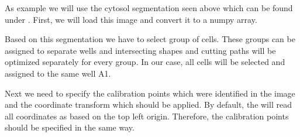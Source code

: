\documentclass[a4paper,10pt,english,openany,oneside]{sphinxmanual}
\begin{document}
\sphinxAtStartPar
As example we will use the cytosol segmentation seen above which can be found under . First, we will load this image and convert it to a numpy array.

\begin{sphinxVerbatim}[commandchars=\\\{\}]
   
   

  
  
\end{sphinxVerbatim}

\sphinxAtStartPar
Based on this segmentation we have to select group of cells. These groups can be assigned to separate wells and intersecting shapes and cutting paths will be optimized separately for every group. In our case, all cells will be selected and assigned to the same well A1.

\begin{sphinxVerbatim}[commandchars=\\\{\}]
  
  \PYG{p}{[}   \PYG{p}{]}
\end{sphinxVerbatim}

\sphinxAtStartPar
Next we need to specify the calibration points which were identified in the image and the coordinate transform which should be applied. By default, the  will read all coordinates as  based on the top left origin. Therefore, the calibration points should be specified in the same way.
\end{document}
